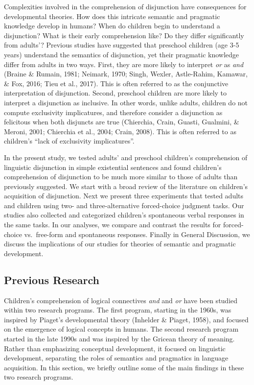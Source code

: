 \documentclass[
  english,
  ,man,floatsintext]{apa6}
\begin{document}
Complexities involved in the comprehension of disjunction have consequences for developmental theories. How does this intricate semantic and pragmatic knowledge develop in humans? When do children begin to understand a disjunction? What is their early comprehension like? Do they differ significantly from adults'? Previous studies have suggested that preschool children (age 3-5 years) understand the semantics of disjunction, yet their pragmatic knowledge differ from adults in two ways. First, they are more likely to interpret \emph{or} as \emph{and} (Braine \& Rumain, 1981; Neimark, 1970; Singh, Wexler, Astle-Rahim, Kamawar, \& Fox, 2016; Tieu et al., 2017). This is often referred to as the conjunctive interpretation of disjunction. Second, preschool children are more likely to interpret a disjunction as inclusive. In other words, unlike adults, children do not compute exclusivity implicatures, and therefore consider a disjunction as felicitous when both disjuncts are true (Chierchia, Crain, Guasti, Gualmini, \& Meroni, 2001; Chierchia et al., 2004; Crain, 2008). This is often referred to as children's \enquote{lack of exclusivity implicatures}.

In the present study, we tested adults' and preschool children's comprehension of linguistic disjunction in simple existential sentences and found children's comprehension of disjunction to be much more similar to those of adults than previously suggested. We start with a broad review of the literature on children's acquisition of disjunction. Next we present three experiments that tested adults and children using two- and three-alternative forced-choice judgment tasks. Our studies also collected and categorized children's spontaneous verbal responses in the same tasks. In our analyses, we compare and contrast the results for forced-choice vs.~free-form and spontaneous responses. Finally in General Discussion, we discuss the implications of our studies for theories of semantic and pragmatic development.

\hypertarget{litreview}{%
\subsection{Previous Research}\label{litreview}}

Children's comprehension of logical connectives \emph{and} and \emph{or} have been studied within two research programs. The first program, starting in the 1960s, was inspired by Piaget's developmental theory (Inhelder \& Piaget, 1958), and focused on the emergence of logical concepts in humans. The second research program started in the late 1990s and was inspired by the Gricean theory of meaning. Rather than emphasizing conceptual development, it focused on linguistic development, separating the roles of semantics and pragmatics in language acquisition. In this section, we briefly outline some of the main findings in these two research programs.
\end{document}
